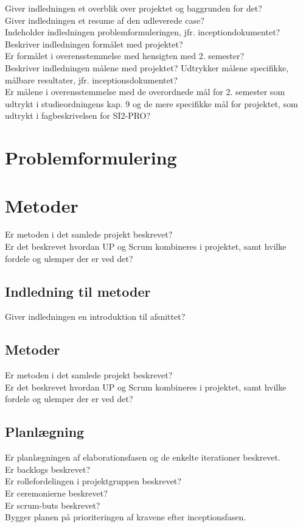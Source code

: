 Giver indledningen et overblik over projektet og baggrunden for det?\\
Giver indledningen et resume af den udleverede case?\\
Indeholder indledningen problemformuleringen, jfr. inceptiondokumentet?\\
Beskriver indledningen formålet med projektet?\\ Er formålet i overensstemmelse med hensigten med 2. semester? \\
Beskriver indledningen målene med projektet? Udtrykker målene specifikke, målbare resultater, jfr. inceptionsdokumentet? \\
Er målene i overensstemmelse med de overordnede mål for 2. semester som udtrykt i studieordningens kap. 9 og de mere specifikke mål for projektet, som udtrykt i fagbeskrivelsen for SI2-PRO?

\section{Problemformulering}

\section{Metoder}
Er metoden i det samlede projekt beskrevet?\\
Er det beskrevet hvordan UP og Scrum kombineres i projektet, samt hvilke fordele og ulemper der er ved det?\\

\subsection{Indledning til metoder}
Giver indledningen en introduktion til  afsnittet?\\
\subsection{Metoder}
Er metoden i det samlede projekt beskrevet?\\
Er det beskrevet hvordan UP og Scrum kombineres i projektet, samt hvilke fordele og ulemper der er ved det?\\
\subsection{Planlægning}
Er planlægningen af elaborationsfasen og de enkelte iterationer beskrevet.\\
Er backlogs beskrevet?\\
Er rollefordelingen i projektgruppen beskrevet?\\
Er ceremonierne beskrevet?\\
Er scrum-buts beskrevet?\\
Bygger planen på prioriteringen af kravene efter inceptionsfasen.\\
